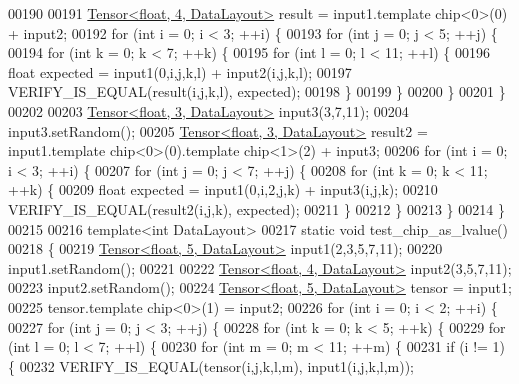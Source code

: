 \begin{DoxyCode}
00190 
00191   \hyperlink{class_eigen_1_1_tensor}{Tensor<float, 4, DataLayout>} result = input1.template chip<0>(0) + input2;
00192   \textcolor{keywordflow}{for} (\textcolor{keywordtype}{int} i = 0; i < 3; ++i) \{
00193     \textcolor{keywordflow}{for} (\textcolor{keywordtype}{int} j = 0; j < 5; ++j) \{
00194       \textcolor{keywordflow}{for} (\textcolor{keywordtype}{int} k = 0; k < 7; ++k) \{
00195         \textcolor{keywordflow}{for} (\textcolor{keywordtype}{int} l = 0; l < 11; ++l) \{
00196           \textcolor{keywordtype}{float} expected = input1(0,i,j,k,l) + input2(i,j,k,l);
00197           VERIFY\_IS\_EQUAL(result(i,j,k,l), expected);
00198         \}
00199       \}
00200     \}
00201   \}
00202 
00203   \hyperlink{class_eigen_1_1_tensor}{Tensor<float, 3, DataLayout>} input3(3,7,11);
00204   input3.setRandom();
00205   \hyperlink{class_eigen_1_1_tensor}{Tensor<float, 3, DataLayout>} result2 = input1.template chip<0>(0).\textcolor{keyword}{template} 
      chip<1>(2) + input3;
00206   \textcolor{keywordflow}{for} (\textcolor{keywordtype}{int} i = 0; i < 3; ++i) \{
00207     \textcolor{keywordflow}{for} (\textcolor{keywordtype}{int} j = 0; j < 7; ++j) \{
00208       \textcolor{keywordflow}{for} (\textcolor{keywordtype}{int} k = 0; k < 11; ++k) \{
00209         \textcolor{keywordtype}{float} expected = input1(0,i,2,j,k) + input3(i,j,k);
00210         VERIFY\_IS\_EQUAL(result2(i,j,k), expected);
00211       \}
00212     \}
00213   \}
00214 \}
00215 
00216 \textcolor{keyword}{template}<\textcolor{keywordtype}{int} DataLayout>
00217 \textcolor{keyword}{static} \textcolor{keywordtype}{void} test\_chip\_as\_lvalue()
00218 \{
00219   \hyperlink{class_eigen_1_1_tensor}{Tensor<float, 5, DataLayout>} input1(2,3,5,7,11);
00220   input1.setRandom();
00221 
00222   \hyperlink{class_eigen_1_1_tensor}{Tensor<float, 4, DataLayout>} input2(3,5,7,11);
00223   input2.setRandom();
00224   \hyperlink{class_eigen_1_1_tensor}{Tensor<float, 5, DataLayout>} tensor = input1;
00225   tensor.template chip<0>(1) = input2;
00226   \textcolor{keywordflow}{for} (\textcolor{keywordtype}{int} i = 0; i < 2; ++i) \{
00227     \textcolor{keywordflow}{for} (\textcolor{keywordtype}{int} j = 0; j < 3; ++j) \{
00228       \textcolor{keywordflow}{for} (\textcolor{keywordtype}{int} k = 0; k < 5; ++k) \{
00229         \textcolor{keywordflow}{for} (\textcolor{keywordtype}{int} l = 0; l < 7; ++l) \{
00230           \textcolor{keywordflow}{for} (\textcolor{keywordtype}{int} m = 0; m < 11; ++m) \{
00231             \textcolor{keywordflow}{if} (i != 1) \{
00232               VERIFY\_IS\_EQUAL(tensor(i,j,k,l,m), input1(i,j,k,l,m));

\end{DoxyCode}

